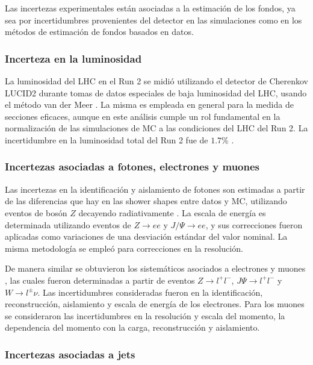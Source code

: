 Las incertezas experimentales están asociadas a la estimación de los fondos, ya sea por incertidumbres provenientes del detector en las simulaciones como en los métodos de estimación de fondos basados en datos.


\subsubsection{Incerteza en la luminosidad}

La luminosidad del LHC en el Run 2 se midió utilizando el detector de Cherenkov LUCID2 \cite{lucid2} durante tomas de datos especiales de baja luminosidad del LHC, usando el método van der Meer \cite{vandermeer1,vandermeer2}. La misma es empleada en general para la medida de secciones eficaces, aunque en este análisis cumple un rol fundamental en la normalización de las simulaciones de MC a las condiciones del LHC del Run 2. La incertidumbre en la luminosidad total del Run 2 fue de $1.7$\% \cite{ATLAS-CONF-2019-021}.


\subsubsection{Incertezas asociadas a fotones, electrones y muones}

Las incertezas en la identificación y aislamiento de fotones son estimadas a partir de las diferencias que hay en las shower shapes  entre datos y MC, utilizando eventos de bosón $Z$ decayendo radiativamente \cite{ph_unc1}. La escala de energía es determinada utilizando eventos de $Z\to ee$ y $J/\Psi \to ee$, y sus correcciones fueron aplicadas como variaciones de una desviación estándar del valor nominal. La misma metodología se empleó para correcciones en la resolución.

De manera similar se obtuvieron los sistemáticos asociados a electrones \cite{ATLAS-CONF-2014-032} y muones \cite{PERF-2015-10}, las cuales fueron determinadas a partir de eventos $Z\to l^+l^-$, $J\Psi\to l^+l^-$ y $W\to l^\pm \nu$. Las incertidumbres consideradas fueron en la identificación, reconstrucción, aislamiento y escala de energía de los electrones. Para los muones se consideraron las incertidumbres en la resolución y escala del momento, la dependencia del momento con la carga, reconstrucción y aislamiento.

\subsubsection{Incertezas asociadas a jets}

